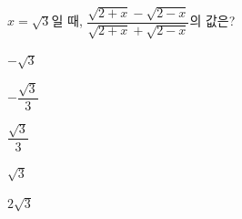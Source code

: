 \hspace*{2mm}\begin{minipage}[t]{\dimexpr\linewidth-2mm\relax}\vspace{0pt}
$x=\sqrt{3}$일 때, $\dfrac{\sqrt{2+x}-\sqrt{2-x}}{\sqrt{2+x}+\sqrt{2-x}}$의 값은?
\begin{choices32}{\rule[-3ex]{0pt}{8ex}$-\sqrt{3}$}{\rule[-3ex]{0pt}{8ex}$-\dfrac{\sqrt{3}}{3}$}{\rule[-3ex]{0pt}{8ex}$\dfrac{\sqrt{3}}{3}$}{\rule[-3ex]{0pt}{8ex}$\sqrt{3}$}{\rule[-3ex]{0pt}{8ex}$2\sqrt{3}$}\end{choices32}\end{minipage}
